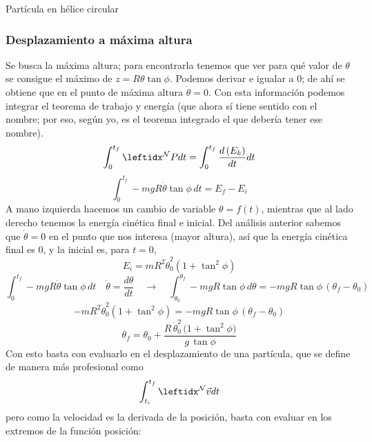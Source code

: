 \begin{solucion}{Partícula en hélice circular}
\subsubsection*{Desplazamiento a máxima altura}
Se busca la máxima altura; para encontrarla tenemos que ver para qué valor de $\theta$ se consigue el máximo de $z=R\theta\tan\phi$. Podemos derivar e igualar a 0; de ahí se obtiene que en el punto de máxima altura $\dot\theta=0$. Con esta información podemos integrar el teorema de trabajo y energía (que ahora sí tiene sentido con el nombre; por eso, según yo, es el teorema integrado el que debería tener ese nombre).
$$\int_{0}^{t_f}\marc{P}{N}dt=\int_0^{t_f}\dfrac{d\left(E_k\right)}{dt}dt$$
$$\int_{0}^{t_f}-mgR\dot\theta\tan\phi\,dt=E_f-E_i$$
A mano izquierda hacemos un cambio de variable $\theta=f(t)$, mientras que al lado derecho tenemos la energía cinética final e inicial. Del análisis anterior sabemos que $\dot\theta=0$ en el punto que nos interesa (mayor altura), así que la energía cinética final es 0, y la inicial es, para $t=0$,
$$E_i=mR^2\dot\theta_0^2(1+\tan^2\phi)$$
$$\int_{0}^{t_f}-mgR\dot\theta\tan\phi\,dt\quad\dot\theta=\dfrac{d\theta}{dt}\quad\longrightarrow\quad\int_{\theta_0}^{\theta_f}-mgR\tan\phi\,d\theta=-mgR\tan\phi\,(\theta_f-\theta_0)$$
$$-mR^2\dot\theta_0^2(1+\tan^2\phi)=-mgR\tan\phi\,(\theta_f-\theta_0)$$
$$\theta_f = \theta_0 +\frac{R\,\dot{\theta}_0^2\,\bigl(1 + \tan^2\phi\bigr)}{g\,\tan\phi}$$
Con esto basta con evaluarlo en el desplazamiento de una partícula, que se define de manera más profesional como
$$\int_{t_i}^{t_f}\marc{\vec{v}}{N}dt$$
pero como la velocidad es la derivada de la posición, basta con evaluar en los extremos de la función posición:

\end{solucion}
